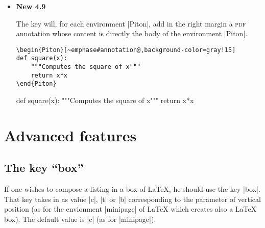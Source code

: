 \documentclass{article}
\begin{document}
\begin{itemize}
\medskip
\begin{Verbatim}
\begin{Piton}[~emphase#paperclip@,background-color=gray!15]
def square(x):
    """Computes the square of x"""
    return x*x
\end{Piton}    
\end{Verbatim}

\medskip
\begin{Piton}[paperclip,background-color=gray!15]
def square(x):
    """Computes the square of x"""
    return x*x
\end{Piton}    


\item \colorbox{yellow!50}{\textbf{New 4.9}}

\nobreak
The key  will, for each environment |{Piton}|, add in the right
margin a \textsc{pdf} annotation whose content is directly the body of the
environment |{Piton}|.

\medskip
\begin{Verbatim}
\begin{Piton}[~emphase#annotation@,background-color=gray!15]
def square(x):
    """Computes the square of x"""
    return x*x
\end{Piton}    
\end{Verbatim}

\medskip
\begin{Piton}[annotation,background-color=gray!15]
def square(x):
    """Computes the square of x"""
    return x*x
\end{Piton}    


\end{itemize}

\section{Advanced features}

\subsection{The key ``box''}

\label{box}

If one wishes to compose a listing in a box of LaTeX, he should use the key
|box|. That key takes in as value |c|, |t| or |b| corresponding to the parameter
of vertical position (as for the envionment |{minipage}| of LaTeX which creates also
a LaTeX box). The default value is |c| (as for |{minipage}|).
\end{document}
